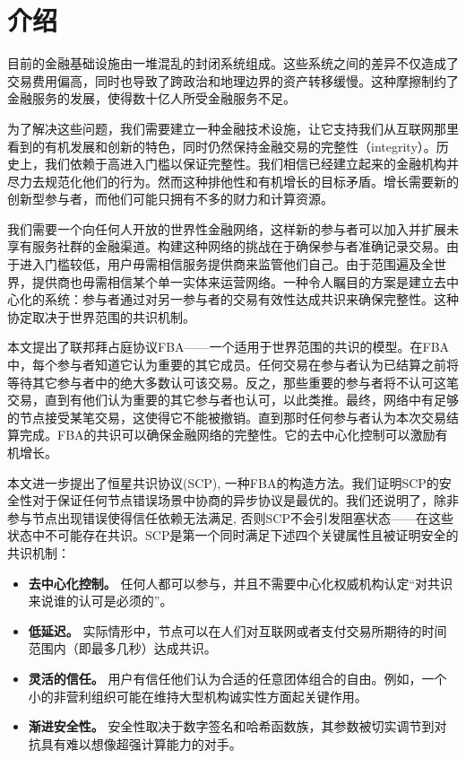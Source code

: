 \section{介绍}

目前的金融基础设施由一堆混乱的封闭系统组成。这些系统之间的差异不仅造成了交易费用偏高，同时也导致了跨政治和地理边界的资产转移缓慢。这种摩擦制约了金融服务的发展，使得数十亿人所受金融服务不足。

为了解决这些问题，我们需要建立一种金融技术设施，让它支持我们从互联网那里看到的有机发展和创新的特色，同时仍然保持金融交易的完整性（integrity）。历史上，我们依赖于高进入门槛以保证完整性。我们相信已经建立起来的金融机构并尽力去规范化他们的行为。然而这种排他性和有机增长的目标矛盾。增长需要新的创新型参与者，而他们可能只拥有不多的财力和计算资源。

我们需要一个向任何人开放的世界性金融网络，这样新的参与者可以加入并扩展未享有服务社群的金融渠道。构建这种网络的挑战在于确保参与者准确记录交易。由于进入门槛较低，用户毋需相信服务提供商来监管他们自己。由于范围遍及全世界，提供商也毋需相信某个单一实体来运营网络。一种令人瞩目的方案是建立去中心化的系统：参与者通过对另一参与者的交易有效性达成共识来确保完整性。这种协定取决于世界范围的共识机制。

本文提出了联邦拜占庭协议FBA——一个适用于世界范围的共识的模型。在FBA中，每个参与者知道它认为重要的其它成员。任何交易在参与者认为已结算之前将等待其它参与者中的绝大多数认可该交易。反之，那些重要的参与者将不认可这笔交易，直到有他们认为重要的其它参与者也认可，以此类推。最终，网络中有足够的节点接受某笔交易，这使得它不能被撤销。直到那时任何参与者认为本次交易结算完成。FBA的共识可以确保金融网络的完整性。它的去中心化控制可以激励有机增长。

本文进一步提出了恒星共识协议(SCP), 一种FBA的构造方法。我们证明SCP的安全性对于保证任何节点错误场景中协商的异步协议是最优的。我们还说明了，除非参与节点出现错误使得信任依赖无法满足, 否则SCP不会引发阻塞状态——在这些状态中不可能存在共识。SCP是第一个同时满足下述四个关键属性且被证明安全的共识机制：

\begin{itemize}
	\item \textbf{去中心化控制。} 任何人都可以参与，并且不需要中心化权威机构认定``对共识来说谁的认可是必须的''。
	\item \textbf{低延迟。} 实际情形中，节点可以在人们对互联网或者支付交易所期待的时间范围内（即最多几秒）达成共识。
	\item \textbf{灵活的信任。} 用户有信任他们认为合适的任意团体组合的自由。例如，一个小的非营利组织可能在维持大型机构诚实性方面起关键作用。
	\item \textbf{渐进安全性。} 安全性取决于数字签名和哈希函数族，其参数被切实调节到对抗具有难以想像超强计算能力的对手。
\end{itemize}

